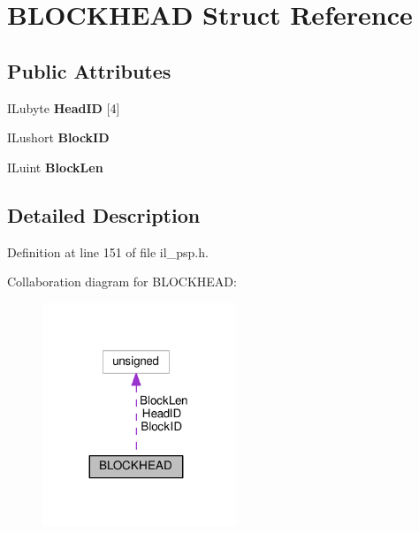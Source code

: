 \hypertarget{structBLOCKHEAD}{}\section{B\+L\+O\+C\+K\+H\+E\+AD Struct Reference}
\label{structBLOCKHEAD}
\subsection*{Public Attributes}
\begin{DoxyCompactItemize}
\item 
\mbox{\label{structBLOCKHEAD_a04cdb591101a970ef537d080d8d51392}} 
I\+Lubyte {\bfseries Head\+ID} \mbox{[}4\mbox{]}
\item 
\mbox{\label{structBLOCKHEAD_ac04fea04ebbeb63a0fafa9d9bce8d238}} 
I\+Lushort {\bfseries Block\+ID}
\item 
\mbox{\label{structBLOCKHEAD_a85119487a9a0a83b210b7bb6d1758d54}} 
I\+Luint {\bfseries Block\+Len}
\end{DoxyCompactItemize}


\subsection{Detailed Description}


Definition at line 151 of file il\+\_\+psp.\+h.



Collaboration diagram for B\+L\+O\+C\+K\+H\+E\+AD\+:
\nopagebreak
\begin{figure}[H]
\begin{center}
\leavevmode
\includegraphics[width=164pt]{d3/d3f/structBLOCKHEAD__coll__graph}
\end{center}
\end{figure}


